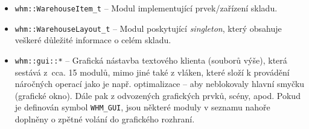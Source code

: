 \begin{itemize}
    \item \texttt{whm::WarehouseItem\_t} -- Modul implementující prvek/zařízení skladu.
    \item \texttt{whm::WarehouseLayout\_t} -- Modul poskytující \emph{singleton}, který obsahuje veškeré důležité informace o celém skladu.
    \item \texttt{whm::gui::*} -- Grafická nástavba textového klienta (souborů výše), která sestává z~cca. 15 modulů, mimo jiné také z vláken, které složí k provádění náročných operací jako je např. optimalizace -- aby neblokovaly hlavní smyčku (grafické okno). Dále pak z odvozených grafických prvků, scény, apod. Pokud je definován symbol \texttt{WHM\_GUI}, jsou některé moduly v seznamu nahoře doplněny o zpětné volání do grafického rozhraní. 
\end{itemize}
